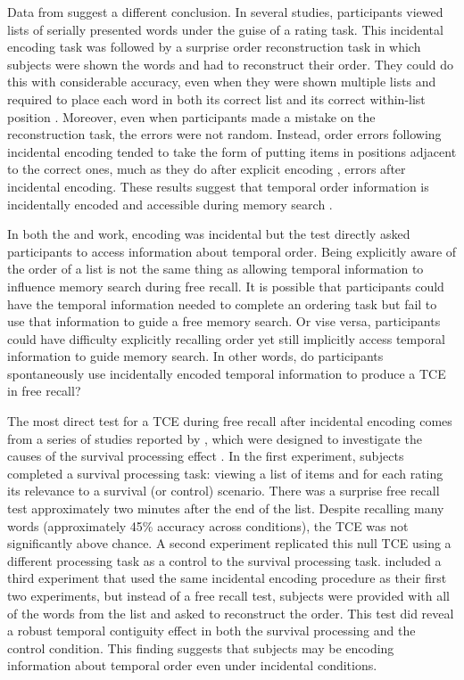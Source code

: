 \documentclass[man,natbib,floatsintext]{apa6} %
\begin{document}
Data from \citet{Nair91, Nair90b} suggest a different conclusion. In several studies, participants viewed lists of serially presented words under the guise of a rating task. This incidental encoding task was followed by a surprise order reconstruction task in which subjects were shown the words and had to reconstruct their order. They could do this with considerable accuracy, even when they were shown multiple lists and required to place each word in both its correct list and its correct within-list position \citet{Nair91}. Moreover, even when participants made a mistake on the reconstruction task, the errors were not random. Instead, order errors following incidental encoding tended to take the form of putting items in positions adjacent to the correct ones, much as they do after explicit encoding \cite{Heal74}, errors after incidental encoding. These results suggest that temporal order information is incidentally encoded and accessible during memory search \citep[but see][for a different prespective]{Hint16}. 

\label{TODO-4}
In both the \citet{BradGlen83,GlenBrad79} and \citet{Nair91, Nair90b} work, encoding was incidental but the test directly asked participants to access information about temporal order. Being explicitly aware of the order of a list is not the same thing as allowing temporal information to influence memory search during free recall. It is possible that participants could have the temporal information needed to complete an ordering task but fail to use that information to guide a free memory search. Or vise versa, participants could have difficulty explicitly recalling order yet still implicitly access temporal information to guide memory search. In other words, do participants spontaneously use incidentally encoded temporal information to produce a TCE in free recall? 

The most direct test for a TCE during free recall after incidental encoding comes from a series of studies reported by \citet{NairEtal17}, which were designed to investigate the causes of the survival processing effect \citep{NairEtal07}. In the first experiment, subjects completed a survival processing task: viewing a list of items and for each rating its relevance to a survival (or control) scenario. There was a surprise free recall test approximately two minutes after the end of the list. Despite recalling many words (approximately 45\% accuracy across conditions), the TCE was not significantly above chance. A second experiment replicated this null TCE using a different processing task as a control to the survival processing task. \citet{NairEtal17} included a third experiment that used the same incidental encoding procedure as their first two experiments, but instead of a free recall test, subjects were provided with all of the words from the list and asked to reconstruct the order. This test did reveal a robust temporal contiguity effect in both the survival processing and the control condition. This finding suggests that subjects may be encoding information about temporal order even under incidental conditions. 
\end{document}
